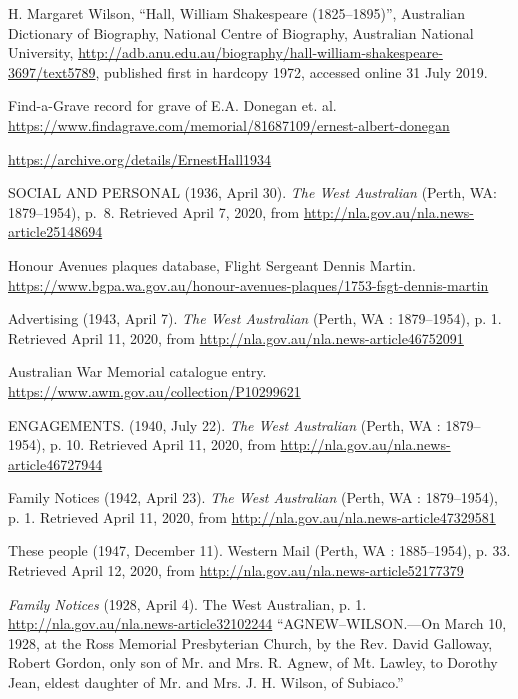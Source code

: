 \begin{thebibliography}{999}
	H. Margaret Wilson, ``Hall, William Shakespeare (1825--1895)'',
	Australian Dictionary of Biography, National Centre of Biography, Australian National University,
	\url{http://adb.anu.edu.au/biography/hall-william-shakespeare-3697/text5789},
	published first in hardcopy 1972, accessed online 31 July 2019.

	Find-a-Grave record for grave of E.A. Donegan et. al.
	\url{https://www.findagrave.com/memorial/81687109/ernest-albert-donegan}

	\url{https://archive.org/details/ErnestHall1934}

	SOCIAL AND PERSONAL (1936, April 30). \emph{The West Australian} (Perth, WA: 1879--1954), p.~8.
	Retrieved April 7, 2020, from \url{http://nla.gov.au/nla.news-article25148694}

	Honour Avenues plaques database, Flight Sergeant Dennis Martin.
	\url{https://www.bgpa.wa.gov.au/honour-avenues-plaques/1753-fsgt-dennis-martin}

	Advertising (1943, April 7). \emph{The West Australian} (Perth, WA : 1879--1954), p. 1.
	Retrieved April 11, 2020, from \url{http://nla.gov.au/nla.news-article46752091}

	Australian War Memorial catalogue entry.
	\url{https://www.awm.gov.au/collection/P10299621}

	ENGAGEMENTS. (1940, July 22). \emph{The West Australian} (Perth, WA : 1879--1954), p. 10.
	Retrieved April 11, 2020, from \url{http://nla.gov.au/nla.news-article46727944}

	Family Notices (1942, April 23). \emph{The West Australian} (Perth, WA : 1879--1954), p. 1.
	Retrieved April 11, 2020, from \url{http://nla.gov.au/nla.news-article47329581}

	These people (1947, December 11). Western Mail (Perth, WA : 1885--1954), p. 33.
	Retrieved April 12, 2020, from \url{http://nla.gov.au/nla.news-article52177379}

	\emph{Family Notices} (1928, April 4). The West Australian, p. 1. \url{http://nla.gov.au/nla.news-article32102244}
	``AGNEW--WILSON.---On March 10, 1928, at the Ross Memorial Presbyterian Church, by the Rev. David Galloway,
	Robert Gordon, only son of Mr. and Mrs. R. Agnew, of Mt. Lawley,
	to Dorothy Jean, eldest daughter of Mr. and Mrs. J. H. Wilson, of Subiaco.''


\end{thebibliography}
